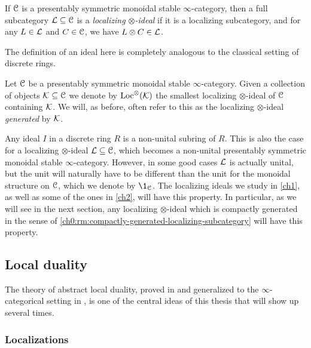 \begin{definition}
    \label{ch0:def:localizing-ideal}
    If $\EuScript{C}$ is a presentably symmetric monoidal stable $\infty$-category, then a full subcategory $\mathcal{L}\subseteq \EuScript{C}$ is a \emph{localizing $\otimes$-ideal} if it is a localizing subcategory, and for any $L\in \mathcal{L}$ and $C\in \EuScript{C}$, we have $L\otimes C\in \mathcal{L}$. 
\end{definition}

The definition of an ideal here is completely analogous to the classical setting of discrete rings. 

\begin{definition}
    Let $\EuScript{C}$ be a presentably symmetric monoidal stable $\infty$-category. Given a collection of objects $\mathcal{K}\subseteq \EuScript{C}$ we denote by $\operatorname{Loc}^\otimes(\mathcal{K})$ the smallest localizing $\otimes$-ideal of $\EuScript{C}$ containing $\mathcal{K}$. We will, as before, often refer to this as the localizing $\otimes$-ideal \emph{generated} by $\mathcal{K}$. 
\end{definition}

Any ideal $I$ in a discrete ring $R$ is a non-unital subring of $R$. This is also the case for a localizing $\otimes$-ideal $\mathcal{L}\subseteq \EuScript{C}$, which becomes a non-unital presentably symmetric monoidal stable $\infty$-category. However, in some good cases $\mathcal{L}$ is actually unital, but the unit will naturally have to be different than the unit for the monoidal structure on $\EuScript{C}$, which we denote by $\1_\C$. The localizing ideals we study in \cref{ch1}, as well as some of the ones in \cref{ch2}, will have this property. In particular, as we will see in the next section, any localizing $\otimes$-ideal which is compactly generated in the sense of \cref{ch0:rm:compactly-generated-localizing-subcategory} will have this property.





\subsection{Local duality}
\label{ch0:ssec:local-duality}

The theory of abstract local duality, proved in \cite{hovey-palmiery-strickland_97} and generalized to the $\infty$-categorical setting in \cite{barthel-heard-valenzuela_2018}, is one of the central ideas of this thesis that will show up several times. 

\subsubsection{Localizations}

